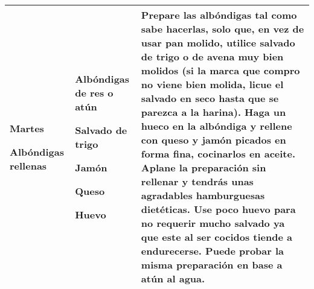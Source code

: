 \documentclass[menu.tex]{subfiles}
\begin{document}
\begin{tabular} {p{3cm} p{4.5cm} p{9cm}}
\pbox{20cm}
{
    \rule{0pt}{3ex}\begin{large}\textbf{Martes}\end{large}\\
    \rule{0pt}{2ex}Albóndigas \\rellenas
}&
\vspace{-0.6cm}
\begin{compactitem} 
    \begin{footnotesize}
        \item Albóndigas de res o atún
        \item Salvado de trigo
        \item Jamón
        \item Queso
        \item Huevo
    \end{footnotesize}
\end{compactitem}&
\vspace{-0.6cm}
Prepare las albóndigas tal como sabe hacerlas, solo que, en vez de usar pan molido, utilice salvado de trigo o de avena muy bien molidos (si la marca que compro no viene bien molida, licue el salvado en seco hasta que se parezca a la harina). Haga un hueco en la albóndiga y rellene con queso y jamón picados en forma fina, cocinarlos en aceite. Aplane la preparación sin rellenar y tendrás unas agradables hamburguesas dietéticas. Use poco huevo para no requerir mucho salvado ya que este al ser cocidos tiende a endurecerse. Puede probar la misma preparación en base a atún al agua.\\
\hline
    

\end{tabular}
\end{document}
